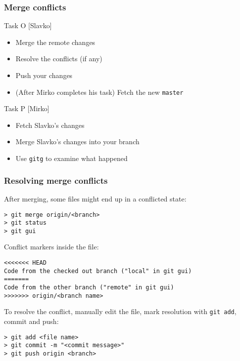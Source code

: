 
\begin{frame}[fragile]
	\frametitle{Merge conflicts}

	\begin{block}{Task O [Slavko]}
	\begin{itemize}
	\item Merge the remote changes
	\item Resolve the conflicts (if any)
	\item Push your changes
	\item (After Mirko completes his task) Fetch the new \texttt{master}
	\end{itemize}
	\end{block}

	\begin{block}{Task P [Mirko]}
	\begin{itemize}

	\item Fetch Slavko's changes
	\item Merge Slavko's changes into your branch
	\item Use \texttt{gitg} to examine what happened
	\end{itemize}
	\end{block}

\end{frame}

\begin{frame}[fragile]
	\frametitle{Resolving merge conflicts}
	
	After merging, some files might end up in a conflicted state:
	\begin{verbatim}
> git merge origin/<branch>
> git status
> git gui
	\end{verbatim}	
	
	Conflict markers inside the file:
	\begin{verbatim}
<<<<<<< HEAD
Code from the checked out branch ("local" in git gui) 
=======
Code from the other branch ("remote" in git gui)
>>>>>>> origin/<branch name>
	\end{verbatim}

	To resolve the conflict, manually edit the file, mark resolution with \texttt{git add}, commit and push:
	\begin{verbatim}
> git add <file name>
> git commit -m "<commit message>"
> git push origin <branch>
	\end{verbatim}
	
\end{frame}

